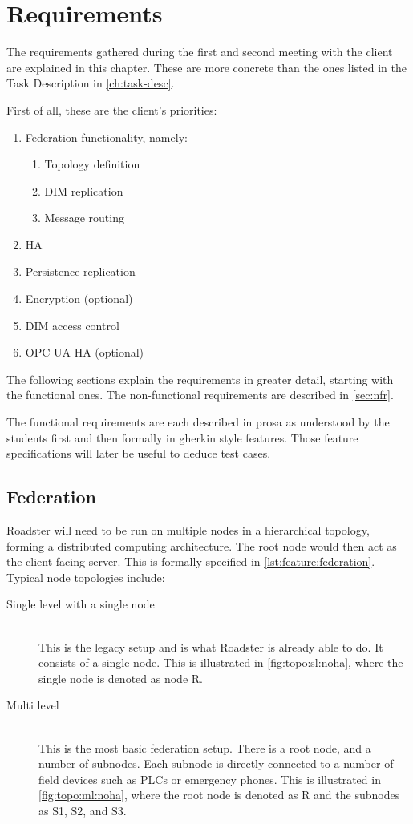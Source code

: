 \chapter{Requirements}\label{ch:reqs}
The requirements gathered during the first and second meeting with the client are
explained in this chapter. These are more concrete than the ones listed in the
Task Description in \autoref{ch:task-desc}.

First of all, these are the client's priorities:

\begin{enumerate}
\item Federation functionality, namely:
	\begin{enumerate}
		\item Topology definition
		\item DIM replication
		\item Message routing
	\end{enumerate}
\item \Gls{HA}
\item Persistence replication
\item Encryption (optional)
\item DIM access control
\item OPC UA \gls{HA} (optional)
\end{enumerate}

The following sections explain the requirements in greater detail, starting
with the functional ones. The non-functional requirements are described in
\autoref{sec:nfr}.

The functional requirements are each described in prosa as understood by the
students first and then formally in \gls{gherkin} style features. Those feature
specifications will later be useful to deduce test cases.

\section{Federation}
Roadster will need to be run on multiple nodes in a hierarchical topology,
forming a distributed computing architecture. The root node would then act as
the client-facing server. This is formally specified in
\autoref{lst:feature:federation}. Typical node topologies include:

\begin{description}
	\item [ Single level with a single node ] \hfill\\
		This is the legacy setup and is what Roadster is already able
		to do. It consists of a single node. This is illustrated in
		\autoref{fig:topo:sl:noha}, where the single node is denoted as node R.

	\item [ Multi level ] \hfill\\
		This is the most basic federation setup. There is a root node, and
		a number of subnodes. Each subnode is directly connected to a number of field devices such as
		\glspl{PLC} or emergency phones. This is illustrated in
		\autoref{fig:topo:ml:noha}, where the root node is denoted as R
		and the subnodes as S1, S2, and S3.
\end{description}


